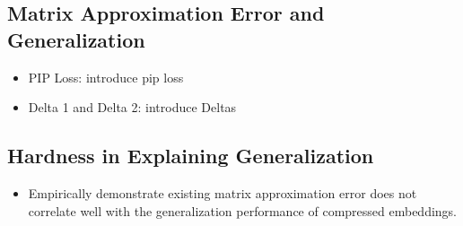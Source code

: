 \subsection{Matrix Approximation Error and Generalization}
\label{subsec:error_gen}
	\begin{itemize}
		\item PIP Loss: introduce pip loss
		\item Delta 1 and Delta 2: introduce Deltas
	\end{itemize}
	
\subsection{Hardness in Explaining Generalization}
\label{subsec:hard_explain}
	\begin{itemize}
		\item Empirically demonstrate existing matrix approximation error does not correlate well with the generalization performance of compressed embeddings.
	\end{itemize}